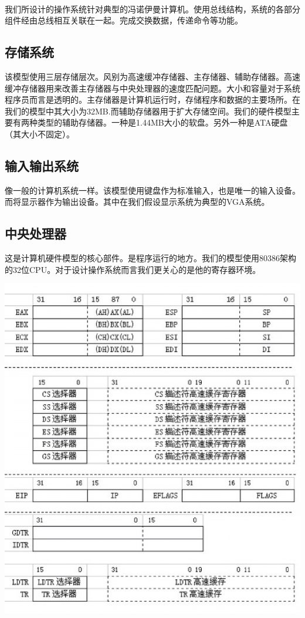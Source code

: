 \documentclass[UTF8,nofonts]{ctexrep}
\begin{document}
\paragraph{}
我们所设计的操作系统针对典型的冯诺伊曼计算机。使用总线结构，系统的各部分组件经由总线相互关联在一起。完成交换数据，传递命令等功能。
\subsection{存储系统}
该模型使用三层存储层次。风别为高速缓冲存储器、主存储器、辅助存储器。高速缓冲存储器用来改善主存储器与中央处理器的速度匹配问题。大小和容量对于系统程序员而言是透明的。主存储器是计算机运行时，存储程序和数据的主要场所。在我们的模型中其大小为32MB.而辅助存储器用于扩大存储空间。我们的硬件模型主要有两种类型的辅助存储器。一种是1.44MB大小的软盘。另外一种是ATA硬盘（其大小不固定）。                                                                                     
\subsection{输入输出系统}
像一般的计算机系统一样。该模型使用键盘作为标准输入，也是唯一的输入设备。而将显示器作为输出设备。其中在我们假设显示系统为典型的VGA系统。
\subsection{中央处理器}
这是计算机硬件模型的核心部件。是程序运行的地方。我们的模型使用80386架构的32位CPU。对于设计操作系统而言我们更关心的是他的寄存器环境。

\begin{center}
\label{80386}
\includegraphics[scale=0.7]{80386.eps}
\end{center}
\end{document}
